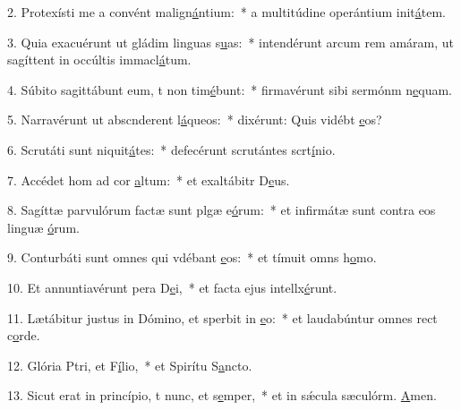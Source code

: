 2. Protexísti me a convént malign\uline{á}ntium:~* a multitúdine operántium init\uline{á}tem.\par 
3. Quia exacuérunt ut gládim linguas s\uline{u}as:~* intendérunt arcum rem amáram, ut sagíttent in occúltis immacl\uline{á}tum.\par 
4. Súbito sagittábunt eum, t non tim\uline{é}bunt:~* firmavérunt sibi sermónm n\uline{e}quam.\par 
5. Narravérunt ut abscnderent l\uline{á}queos:~* dixérunt: Quis vidébt \uline{e}os?\par 
6. Scrutáti sunt niquit\uline{á}tes:~* defecérunt scrutántes scrt\uline{í}nio.\par 
7. Accédet hom ad cor \uline{a}ltum:~* et exaltábitr D\uline{e}us.\par 
8. Sagíttæ parvulórum factæ sunt plgæ e\uline{ó}rum:~* et infirmátæ sunt contra eos linguæ \uline{ó}rum.\par 
9. Conturbáti sunt omnes qui vdébant \uline{e}os:~* et tímuit omns h\uline{o}mo.\par 
10. Et annuntiavérunt pera D\uline{e}i,~* et facta ejus intellx\uline{é}runt.\par 
11. Lætábitur justus in Dómino, et sperbit in \uline{e}o:~* et laudabúntur omnes rect c\uline{o}rde.\par 
12. Glória Ptri, et F\uline{í}lio,~* et Spirítu S\uline{a}ncto.\par 
13. Sicut erat in princípio, t nunc, et s\uline{e}mper,~* et in sǽcula sæculórm. \uline{A}men.\par 
